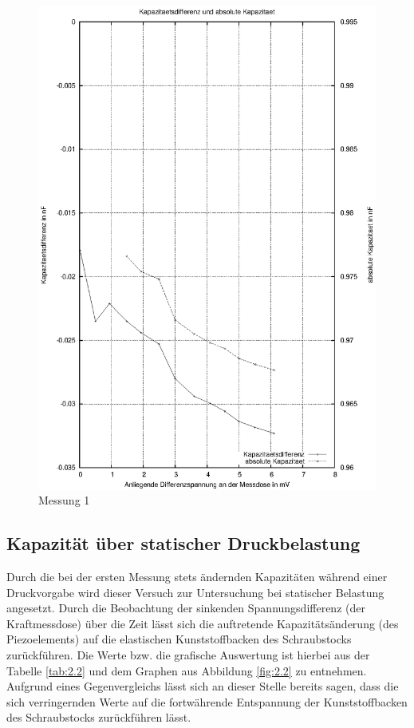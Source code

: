\documentclass[11pt]{scrreprt} %
\begin{document}
\begin {figure}[htbp]
      \begin{center}
        \includegraphics{tabelle2_1_1}
      \end{center}
\caption{Messung 1}
\label{fig:2.1}
\end{figure}

\subsection{Kapazität über statischer Druckbelastung}
Durch die bei der ersten Messung stets ändernden Kapazitäten während einer Druckvorgabe wird dieser Versuch zur Untersuchung bei statischer Belastung angesetzt. Durch die Beobachtung der sinkenden Spannungsdifferenz (der Kraftmessdose) über die Zeit lässt sich die auftretende Kapazitätsänderung (des Piezoelements) auf die elastischen Kunststoffbacken des Schraubstocks zurückführen. Die Werte bzw. die grafische Auswertung ist hierbei aus der Tabelle \vref{tab:2.2} und dem Graphen aus Abbildung \vref{fig:2.2} zu entnehmen. \\
Aufgrund eines Gegenvergleichs lässt sich an dieser Stelle bereits sagen, dass die sich verringernden Werte auf die fortwährende Entspannung der Kunststoffbacken des Schraubstocks zurückführen lässt.
\end{document}
